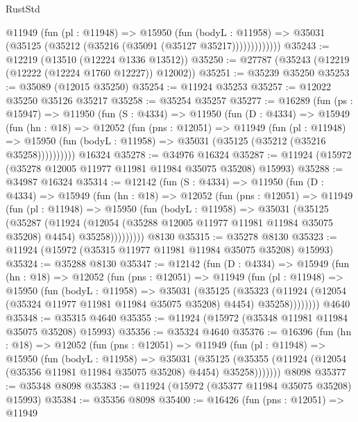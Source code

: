 \begin{lexlean}{RustStd}
\begin{coremodule}
              @11949
                (fun (pl : @11948) =>
                @15950
                  (fun (bodyL : @11958) =>
                  @35031 (@35125 (@35212 (@35216 (@35091 (@35127 @35217)))))))))))))
@35243 := @12219 (@13510 (@12224 @1336 @13512))
@35250 := @27787 (@35243 (@12219 (@12222 (@12224 @1760 @12227)) @12002))
@35251 := @35239 @35250
@35253 := @35089 (@12015 @35250)
@35254 := @11924 @35253
@35257 := @12022 @35250 @35126 @35217
@35258 := @35254 @35257
@35277 := @16289
    (fun (ps : @15947) =>
    @11950
      (fun (S : @4334) =>
      @11950
        (fun (D : @4334) =>
        @15949
          (fun (hn : @18) =>
          @12052
            (fun (pns : @12051) =>
            @11949
              (fun (pl : @11948) =>
              @15950 (fun (bodyL : @11958) => @35031 (@35125 (@35212 (@35216 @35258))))))))))
    @16324
@35278 := @34976 @16324
@35287 := @11924 (@15972 (@35278 @12005 @11977 @11981 @11984 @35075 @35208) @15993)
@35288 := @34987 @16324
@35314 := @12142
    (fun (S : @4334) =>
    @11950
      (fun (D : @4334) =>
      @15949
        (fun (hn : @18) =>
        @12052
          (fun (pns : @12051) =>
          @11949
            (fun (pl : @11948) =>
            @15950
              (fun (bodyL : @11958) =>
              @35031
                (@35125
                  (@35287
                    (@11924
                      (@12054 (@35288 @12005 @11977 @11981 @11984 @35075 @35208) @4454)
                      @35258)))))))))
    @8130
@35315 := @35278 @8130
@35323 := @11924 (@15972 (@35315 @11977 @11981 @11984 @35075 @35208) @15993)
@35324 := @35288 @8130
@35347 := @12142
    (fun (D : @4334) =>
    @15949
      (fun (hn : @18) =>
      @12052
        (fun (pns : @12051) =>
        @11949
          (fun (pl : @11948) =>
          @15950
            (fun (bodyL : @11958) =>
            @35031
              (@35125
                (@35323
                  (@11924 (@12054 (@35324 @11977 @11981 @11984 @35075 @35208) @4454) @35258))))))))
    @4640
@35348 := @35315 @4640
@35355 := @11924 (@15972 (@35348 @11981 @11984 @35075 @35208) @15993)
@35356 := @35324 @4640
@35376 := @16396
    (fun (hn : @18) =>
    @12052
      (fun (pns : @12051) =>
      @11949
        (fun (pl : @11948) =>
        @15950
          (fun (bodyL : @11958) =>
          @35031
            (@35125
              (@35355 (@11924 (@12054 (@35356 @11981 @11984 @35075 @35208) @4454) @35258)))))))
    @8098
@35377 := @35348 @8098
@35383 := @11924 (@15972 (@35377 @11984 @35075 @35208) @15993)
@35384 := @35356 @8098
@35400 := @16426
    (fun (pns : @12051) =>
    @11949

\end{coremodule}
\end{lexlean}
